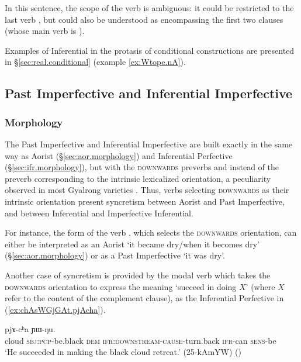 In this sentence, the scope of the verb  is ambiguous: it could be restricted to the last verb , but could also be understood as encompassing the first two clauses (whose main verb is ).

Examples of Inferential in the protasis of conditional constructions are presented in §\ref{sec:real.conditional} (example \ref{ex:Wtope.nA}).

\subsection{Past Imperfective and Inferential Imperfective} \label{sec:pst.ifr.ipfv}

\subsubsection{Morphology} \label{sec:pst.ifr.ipfv.morphology}
The Past Imperfective and Inferential Imperfective are built exactly in the same way as Aorist (§\ref{sec:aor.morphology}) and Inferential Perfective (§\ref{sec:ifr.morphology}), but with the \textsc{downwards} preverbs  and  instead of the preverb corresponding to the intrinsic lexicalized orientation, a peculiarity observed in most Gyalrong varieties \citep{lin11direction}. Thus, verbs selecting \textsc{downwards} as their intrinsic orientation present syncretism between Aorist and Past Imperfective, and between Inferential and Imperfective Inferential.

For instance, the form  of the verb , which selects the \textsc{downwards} orientation, can either be interpreted as an Aorist `it became dry/when it becomes dry' (§\ref{sec:aor.morphology}) or as a Past Imperfective `it was dry'.

Another case of syncretism is provided by the modal verb  which takes the \textsc{downwards} orientation to express the meaning `succeed in doing $X$' (where $X$ refer to the content of the complement clause), as the Inferential Perfective  in (\ref{ex:chAsWGjGAt.pjAcha}).

\begin{exe}
\ex \label{ex:chAsWGjGAt.pjAcha}
 pjɤ-cʰa ɲɯ-ŋu. \\
cloud \textsc{sbj}:\textsc{pcp}-be.black \textsc{dem} \textsc{ifr}:\textsc{downstream}-\textsc{cause}-turn.back \textsc{ifr}-can \textsc{sens}-be \\
\glt `He succeeded in making the black cloud retreat.' (25-kAmYW)
()
\end{exe}

